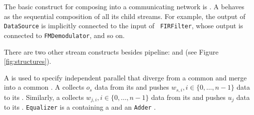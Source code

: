 


The basic construct for composing \filters into a communicating
network is {\pipeline}.  A {\pipeline} behaves as the sequential
composition of all its child streams.  For example, the output of
{\tt DataSource} is implicitly connected to the input of {\tt
FIRFilter}, whose output is connected to {\tt FMDemodulator}, and
so on.

There are two other stream constructs besides pipeline:
{\splitjoin} and {\feedbackloop} (see Figure
\ref{fig:structures}).

A {\splitjoin} is used to specify independent parallel {\streams}
that diverge from a common {\splitter} and merge into a common
{\joiner}. A {\splitter} collects $o_s$ data from its {\Input}
{\Channel} and pushes $w_{s,i}, i \in \{0,\dots,n-1\}$ data to its
{\Output} {\Channels}. Similarly, a {\joiner} collects $w_{j,i}, i
\in \{0,\dots,n-1\}$ data from its {\Input} {\Channel} and pushes
$u_j$ data to its {\Output} {\Channel}. {\tt Equalizer} is a
\pipeline containing a \splitjoin and an {\tt Adder} \filter.

\begin{comment}
There are two kinds of {\splitters}: 1) {\duplicate}, which replicates
each data item and sends a copy to each parallel \stream, and 2)
{\roundrobin}$(w_0, \dots, w_{n-1})$, which sends the first $w_0$
items to the first \stream, the next $w_1$ items to the second
\stream, and so on.  {\roundrobin} is also the only type of {\joiner}
that we support; its function is analogous to a {\roundrobin}
{\splitter}.  If a {\roundrobin} is written without any weights, we
assume that all $w_i = 1$. The {\splitter} and {\joiner} type are
specified with the keywords {\tt split} and {\tt join},
respectively (see Figure \ref{fig:radiocode}); the parallel
streams are specified by successive calls to {\tt add}, with the
$i$'th call setting the $i$'th stream in the splitjoin.
\end{comment}

